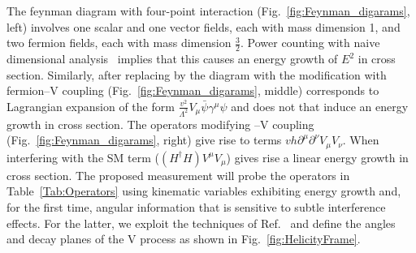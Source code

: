 \documentclass[a4paper,11pt]{article}
\renewcommand{\PV}{{{{V}}}\xspace}
\newcommand{\VH}{{{\PV}{\PH}}\xspace}
\begin{document}
The feynman diagram with four-point interaction (Fig.~\ref{fig:Feynman_digarams}, left) involves one scalar and one vector fields, each with mass dimension 1, and two fermion fields, each with mass dimension $\frac{3}{2}$.
Power counting with naive dimensional analysis~\cite{Manohar:1983md} implies that this causes an energy growth of $E^2$ in cross section. 
Similarly, after replacing \PH by  the diagram with the modification with fermion--\PV coupling (Fig.~\ref{fig:Feynman_digarams}, middle) 
corresponds to Lagrangian expansion of the form $\frac{v^2}{{\Lambda}^2} V_{\mu} \bar{\psi} {{\gamma}^{\mu}} {\psi}$ %
and does not that induce an energy growth in cross section. 
The operators modifying \PH--\PV coupling (Fig.~\ref{fig:Feynman_digarams}, right) give rise to terms $vh {\partial}^{\mu}{\partial}^{\nu} V_{\mu}V_{\nu}$.
When interfering with the SM term ($\left(H^{\dagger}H\right) V^{\mu}V_{\mu}$) gives rise a linear energy growth in cross section.
The proposed measurement will probe the operators in Table~\ref{Tab:Operators} 
using kinematic variables exhibiting energy growth and, for the first time, angular information that is sensitive to subtle interference effects.
For the latter, we exploit the techniques of Ref.~\cite{Banerjee:2019twi} and define the angles and decay planes of the \VH process as shown in Fig.~\ref{fig:HelicityFrame}.
\end{document}
